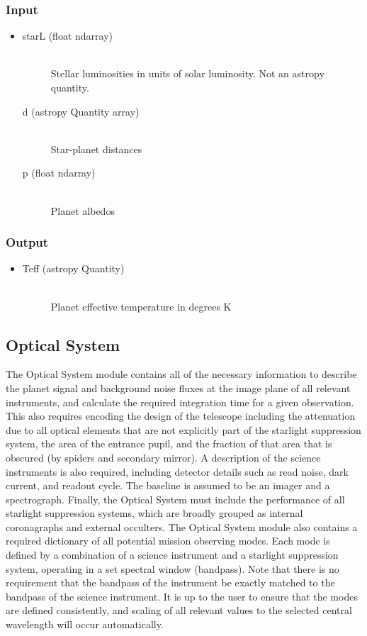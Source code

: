 \documentclass[cleanfoot]{asme2ej}
\begin{document}
\subsubsection*{Input}
\begin{itemize}
\item
\begin{description}
    \item[starL (float ndarray)] \hfill \\ Stellar luminosities in units of solar luminosity. Not an astropy quantity.
    \item[d (astropy Quantity array)] \hfill \\ Star-planet distances
    \item[p (float ndarray)] \hfill \\ Planet albedos
\end{description}
\end{itemize}
\subsubsection*{Output}
\begin{itemize}
\item
\begin{description}
    \item[Teff (astropy Quantity)] \hfill \\ Planet effective temperature in degrees K
\end{description}
\end{itemize}


\subsection{Optical System}
The Optical System module contains all of the necessary information to describe the planet signal and background noise fluxes at the image plane of all relevant instruments, and calculate the required integration time for a given observation.  This also requires encoding the design of the telescope including the attenuation due to all optical elements that are not explicitly part of the starlight suppression system, the area of the entrance pupil, and the fraction of that area that is obscured (by spiders and secondary mirror). A description of the science instruments is also required, including detector details such as read noise, dark current, and readout cycle. The baseline is assumed to be an imager and a spectrograph. Finally, the Optical System must include the performance of all starlight suppression systems, which are broadly grouped as internal coronagraphs and external occulters. The Optical System module also contains a required dictionary of all potential mission observing modes. Each mode is defined by a combination of a science instrument and a starlight suppression system, operating in a set spectral window (bandpass). Note that there is no requirement that the bandpass of the instrument be exactly matched to the bandpass of the science instrument.  It is up to the user to ensure that the modes are defined consistently, and scaling of all relevant values to the selected central wavelength will occur automatically.
\end{document}
